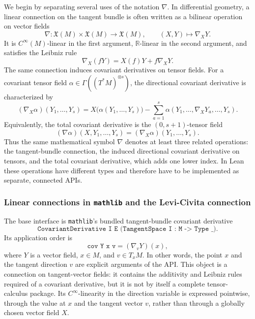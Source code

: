 \documentclass[11pt]{article}
\theoremstyle{plain}
\theoremstyle{definition}
\theoremstyle{remark}
\begin{document}
We begin by separating several uses of the notation $\nabla$.  In differential
geometry, a linear connection on the tangent bundle is often written as a
bilinear operation on vector fields
\[
  \nabla : \mathfrak X(M) \times \mathfrak X(M) \to \mathfrak X(M),
  \qquad
  (X,Y) \mapsto \nabla_XY .
\]
It is $C^\infty(M)$-linear in the first argument, $\mathbb R$-linear in the
second argument, and satisfies the Leibniz rule
\[
  \nabla_X(fY) = X(f)Y + f\nabla_XY .
\]
The same connection induces covariant derivatives on tensor fields.  For a
covariant tensor field $\alpha \in \Gamma((T^*M)^{\otimes s})$, the directional
covariant derivative is characterized by
\[
  (\nabla_X\alpha)(Y_1,\ldots,Y_s)
  =
  X\bigl(\alpha(Y_1,\ldots,Y_s)\bigr)
  -
  \sum_{a=1}^s
  \alpha(Y_1,\ldots,\nabla_XY_a,\ldots,Y_s).
\]
Equivalently, the total covariant derivative is the $(0,s+1)$-tensor field
\[
  (\nabla\alpha)(X,Y_1,\ldots,Y_s)
  =
  (\nabla_X\alpha)(Y_1,\ldots,Y_s).
\]
Thus the same mathematical symbol $\nabla$ denotes at least three related
operations: the tangent-bundle connection, the induced directional covariant
derivative on tensors, and the total covariant derivative, which adds one lower
index.  In Lean these operations have different types and therefore have to be
implemented as separate, connected APIs.

\subsubsection{Linear connections in \texttt{mathlib} and the Levi-Civita connection}

The base interface is \texttt{mathlib}'s bundled tangent-bundle covariant
derivative
\[
  \texttt{CovariantDerivative I E (TangentSpace I : M -> Type \_)} .
\]
Its application order is
\[
  \texttt{cov Y x v} = (\nabla_vY)(x),
\]
where $Y$ is a vector field, $x\in M$, and $v\in T_xM$.  In other words, the
point $x$ and the tangent direction $v$ are explicit arguments of the API.  This
object is a connection on tangent-vector fields: it contains the additivity and
Leibniz rules required of a covariant derivative, but it is not by itself a
complete tensor-calculus package.  Its $C^\infty$-linearity in the direction
variable is expressed pointwise, through the value at $x$ and the tangent vector
$v$, rather than through a globally chosen vector field $X$.
\end{document}
